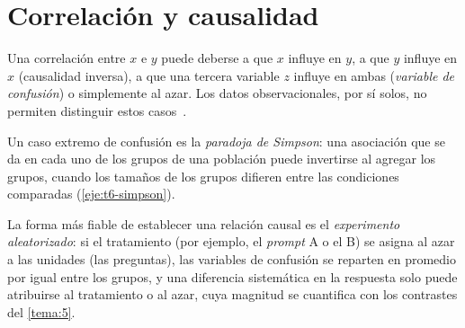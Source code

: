 \addtocounter{definicion}{1}%

\section{Correlación y causalidad}

Una correlación entre $x$ e $y$ puede deberse a que $x$ influye en $y$, a que $y$ influye en $x$ (causalidad inversa), a que una tercera variable $z$ influye en ambas (\emph{variable de confusión}) o simplemente al azar. Los datos observacionales, por sí solos, no permiten distinguir estos casos~\cite[cap.~16]{wasserman}.

\addtocounter{definicion}{1}%

Un caso extremo de confusión es la \emph{paradoja de Simpson}: una asociación que se da en cada uno de los grupos de una población puede invertirse al agregar los grupos, cuando los tamaños de los grupos difieren entre las condiciones comparadas (\cref{eje:t6-simpson}).

La forma más fiable de establecer una relación causal es el \emph{experimento aleatorizado}: si el tratamiento (por ejemplo, el \emph{prompt} A o el B) se asigna al azar a las unidades (las preguntas), las variables de confusión se reparten en promedio por igual entre los grupos, y una diferencia sistemática en la respuesta solo puede atribuirse al tratamiento o al azar, cuya magnitud se cuantifica con los contrastes del \cref{tema:5}.

\addtocounter{definicion}{1}%

\addtocounter{definicion}{1}%

